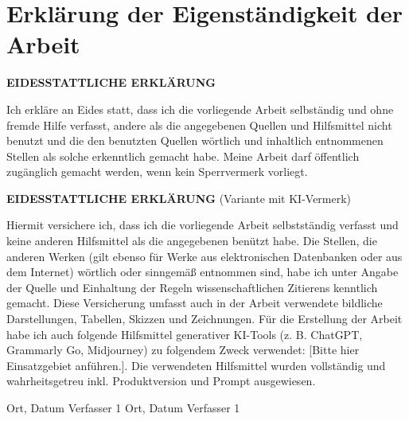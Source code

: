 \chapter*{Erklärung der Eigenständigkeit der Arbeit}
\label{cha:affirmation}


\textbf{EIDESSTATTLICHE ERKLÄRUNG }
\vspace{0.4cm}

Ich erkläre an Eides statt, dass ich die vorliegende Arbeit selbständig und ohne fremde Hilfe verfasst, andere als die angegebenen Quellen und Hilfsmittel nicht benutzt und die den benutzten Quellen wörtlich und inhaltlich entnommenen Stellen als solche erkenntlich gemacht habe. Meine Arbeit darf öffentlich zugänglich gemacht werden, wenn kein Sperrvermerk vorliegt.

\vfill\vfill


\textbf{EIDESSTATTLICHE ERKLÄRUNG} (Variante mit KI-Vermerk)

\vspace{0.4cm}

Hiermit versichere ich, dass ich die vorliegende Arbeit selbstständig verfasst und keine anderen Hilfsmittel als die angegebenen benützt habe. Die Stellen, die anderen Werken (gilt ebenso für Werke aus elektronischen Datenbanken oder aus dem Internet) wörtlich oder sinngemäß entnommen sind, habe ich unter Angabe der Quelle und Einhaltung der Regeln wissenschaftlichen Zitierens kenntlich gemacht. Diese Versicherung umfasst auch in der Arbeit verwendete bildliche Darstellungen, Tabellen, Skizzen und Zeichnungen. Für die Erstellung der Arbeit habe ich auch folgende Hilfsmittel generativer KI-Tools (z. B. ChatGPT, Grammarly Go, Midjourney) zu folgendem Zweck verwendet: [Bitte hier Einsatzgebiet anführen.]. Die verwendeten Hilfsmittel wurden vollständig und wahrheitsgetreu inkl. Produktversion und Prompt ausgewiesen.

\vspace{0.4cm}

Ort, Datum  \hspace{5cm}Verfasser  1     
\vfill    
Ort, Datum  \hspace{5cm}Verfasser  1                                                  
